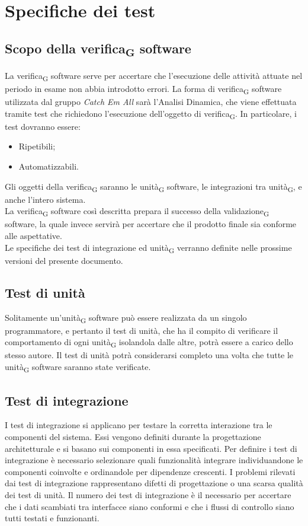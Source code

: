 \section{Specifiche dei test}

\subsection{Scopo della verifica\textsubscript{G} software}
La verifica\textsubscript{G} software serve per accertare che l'esecuzione delle attività attuate nel periodo in esame non abbia introdotto errori. La forma di verifica\textsubscript{G} software utilizzata dal gruppo \textit{Catch Em All} sarà l'Analisi Dinamica, che viene effettuata tramite test che richiedono l'esecuzione dell'oggetto di verifica\textsubscript{G}. In particolare, i test dovranno essere:
\begin{itemize}
	\item Ripetibili;
	\item Automatizzabili.
\end{itemize}
Gli oggetti della verifica\textsubscript{G} saranno le unità\textsubscript{G} software, le integrazioni tra unità\textsubscript{G}, e anche l'intero sistema.\\
La verifica\textsubscript{G} software così descritta prepara il successo della validazione\textsubscript{G} software, la quale invece servirà per accertare che il prodotto finale sia conforme alle aspettative.\\
Le specifiche dei test di integrazione ed unità\textsubscript{G} verranno definite nelle prossime versioni del presente documento.
\subsection{Test di unità}
Solitamente un'unità\textsubscript{G} software può essere realizzata da un singolo programmatore, e pertanto il test di unità, che ha il compito di verificare il comportamento di ogni unità\textsubscript{G} isolandola dalle altre, potrà essere a carico dello stesso autore. Il test di unità potrà considerarsi completo una volta che tutte le unità\textsubscript{G} software saranno state verificate.

\subsection{Test di integrazione}
I test di integrazione si applicano per testare la corretta interazione tra le componenti del sistema. Essi vengono definiti durante la progettazione architetturale e si basano sui componenti in essa specificati.
Per definire i test di integrazione è necessario selezionare quali funzionalità integrare individuandone le componenti coinvolte e ordinandole per dipendenze crescenti.
I problemi rilevati dai test di integrazione rappresentano difetti di progettazione o una scarsa qualità dei test di unità. Il numero dei test di integrazione è il necessario per accertare che i dati scambiati tra interfacce siano conformi e che i flussi di controllo siano tutti testati e funzionanti.

